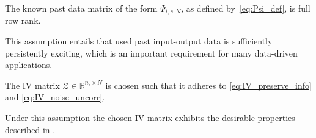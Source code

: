 \begin{assum}\label{assum:PE}
    The known past data matrix of the form $\Psi_{i,s,N}$, as defined by~\eqref{eq:Psi_def}, is full row rank.
\end{assum}
This assumption entails that used past input-output data is sufficiently persistently exciting, which is an important requirement for many data-driven applications. %

\begin{assum}\label{assum:IV_def}
    The \acs{IV} matrix $\mathcal{Z}\in\mathbb{R}^{n_\mathrm{z}\times N}$ is chosen such that it adheres to \eqref{eq:IV_preserve_info} and \eqref{eq:IV_noise_uncorr}.
\end{assum}
Under this assumption the chosen \acs{IV} matrix exhibits the desirable properties described in .

